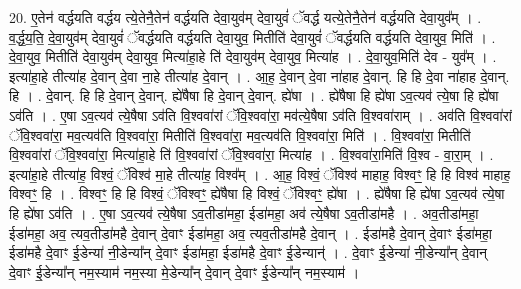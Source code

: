 \documentclass[17pt]{extarticle}
\begin{document}
20. ए॒तेन॑ वर्द्धयति वर्द्धय त्ये॒तेनै॒तेन॑ वर्द्धयति देवा॒युव॑म् देवा॒युवं॑ ॅवर्द्ध यत्ये॒तेनै॒तेन॑ वर्द्धयति देवा॒युव᳚म् । . व॒र्द्ध॒य॒ति॒ दे॒वा॒युव॑म् देवा॒युवं॑ ॅवर्द्धयति वर्द्धयति देवा॒युव॒ मितीति॑ देवा॒युवं॑ ॅवर्द्धयति वर्द्धयति देवा॒युव॒ मिति॑ । . दे॒वा॒युव॒ मितीति॑ देवा॒युव॑म् देवा॒युव॒ मित्या॑हा॒हे ति॑ देवा॒युव॑म् देवा॒युव॒ मित्या॑ह । . दे॒वा॒युव॒मिति॑ देव - युव᳚म् । . इत्या॑हा॒हे तीत्या॑ह दे॒वान् दे॒वा ना॒हे तीत्या॑ह दे॒वान् । . आ॒ह॒ दे॒वान् दे॒वा ना॑हाह दे॒वान्. हि हि दे॒वा ना॑हाह दे॒वान्. हि । . दे॒वान्. हि हि दे॒वान् दे॒वान्. ह्ये॑षैषा हि दे॒वान् दे॒वान्. ह्ये॑षा । . ह्ये॑षैषा हि ह्ये॑षा ऽव॒त्यव॑ त्ये॒षा हि ह्ये॑षा ऽव॑ति । . ए॒षा ऽव॒त्यव॑ त्ये॒षैषा ऽव॑ति वि॒श्ववा॑रां ॅवि॒श्ववा॑रा॒ मव॑त्ये॒षैषा ऽव॑ति वि॒श्ववा॑राम् । . अव॑ति वि॒श्ववा॑रां ॅवि॒श्ववा॑रा॒ मव॒त्यव॑ति वि॒श्ववा॑रा॒ मितीति॑ वि॒श्ववा॑रा॒ मव॒त्यव॑ति वि॒श्ववा॑रा॒ मिति॑ । . वि॒श्ववा॑रा॒ मितीति॑ वि॒श्ववा॑रां ॅवि॒श्ववा॑रा॒ मित्या॑हा॒हे ति॑ वि॒श्ववा॑रां ॅवि॒श्ववा॑रा॒ मित्या॑ह । . वि॒श्ववा॑रा॒मिति॑ वि॒श्व - वा॒रा॒म् । . इत्या॑हा॒हे तीत्या॑ह॒ विश्वं॒ ॅविश्व॑ मा॒हे तीत्या॑ह॒ विश्व᳚म् । . आ॒ह॒ विश्वं॒ ॅविश्व॑ माहाह॒ विश्वꣳ॒॒ हि हि विश्व॑ माहाह॒ विश्वꣳ॒॒ हि । . विश्वꣳ॒॒ हि हि विश्वं॒ ॅविश्वꣳ॒॒ ह्ये॑षैषा हि विश्वं॒ ॅविश्वꣳ॒॒ ह्ये॑षा । . ह्ये॑षैषा हि ह्ये॑षा ऽव॒त्यव॑ त्ये॒षा हि ह्ये॑षा ऽव॑ति । . ए॒षा ऽव॒त्यव॑ त्ये॒षैषा ऽव॒तीडा॑महा॒ ईडा॑महा॒ अव॑ त्ये॒षैषा ऽव॒तीडा॑महै । . अव॒तीडा॑महा॒ ईडा॑महा॒ अव॒ त्यव॒तीडा॑महै दे॒वान् दे॒वाꣳ ईडा॑महा॒ अव॒ त्यव॒तीडा॑महै दे॒वान् । . ईडा॑महै दे॒वान् दे॒वाꣳ ईडा॑महा॒ ईडा॑महै दे॒वाꣳ ई॒डेन्या॑ नी॒डेन्या᳚न् दे॒वाꣳ ईडा॑महा॒ ईडा॑महै दे॒वाꣳ ई॒डेन्यान्॑ । . दे॒वाꣳ ई॒डेन्या॑ नी॒डेन्या᳚न् दे॒वान् दे॒वाꣳ ई॒डेन्या᳚न् नम॒स्याम॑ नम॒स्या मे॒डेन्या᳚न् दे॒वान् दे॒वाꣳ ई॒डेन्या᳚न् नम॒स्याम॑ । \newline
\end{document}
